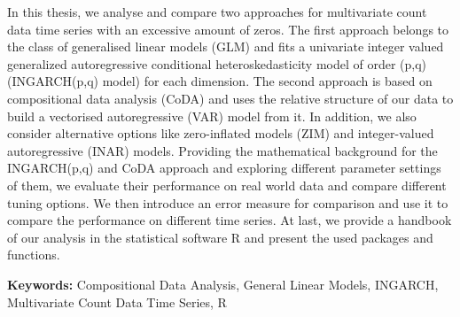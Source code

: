 In this thesis, we analyse and compare two approaches for multivariate count data time series with an excessive amount of zeros. The first approach belongs to the class of generalised linear models (GLM) and fits a univariate integer valued generalized autoregressive conditional heteroskedasticity model of order (p,q) (INGARCH(p,q) model) for each dimension. The second approach is based on compositional data analysis (CoDA) and uses the relative structure of our data to build a vectorised autoregressive (VAR) model from it. In addition, we also consider alternative options like zero-inflated models (ZIM) and integer-valued autoregressive (INAR) models. Providing the mathematical background for the INGARCH(p,q) and CoDA approach and exploring different parameter settings of them, we evaluate their performance on real world data and compare different tuning options. We then introduce an error measure for comparison and use it to compare the performance on different time series. At last, we provide a handbook of our analysis in the statistical software R and present the used packages and functions. \newline

\textbf{Keywords:} Compositional Data Analysis, General Linear Models, INGARCH, Multivariate Count Data Time Series, R